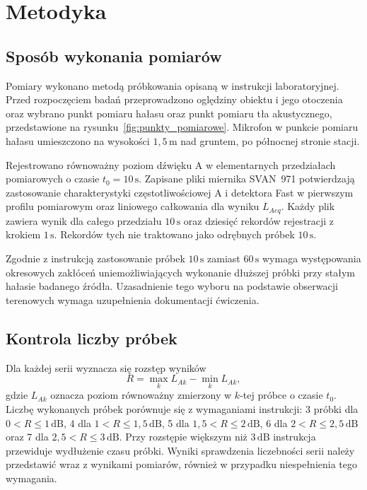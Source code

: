 \section{Metodyka}
\label{sec:metodyka}

\subsection{Sposób wykonania pomiarów}
Pomiary wykonano metodą próbkowania opisaną w instrukcji
laboratoryjnej. Przed rozpoczęciem badań przeprowadzono oględziny
obiektu i jego otoczenia oraz wybrano punkt pomiaru hałasu
oraz punkt pomiaru tła akustycznego, przedstawione na
rysunku~\ref{fig:punkty_pomiarowe}.
Mikrofon w punkcie pomiaru hałasu umieszczono na wysokości
$1{,}5\,\mathrm{m}$ nad gruntem, po północnej stronie stacji.

Rejestrowano równoważny poziom dźwięku A w elementarnych
przedziałach pomiarowych o czasie $t_0=10\,\mathrm{s}$.
Zapisane pliki miernika SVAN~971 potwierdzają zastosowanie
charakterystyki częstotliwościowej A i detektora Fast w pierwszym
profilu pomiarowym oraz liniowego całkowania dla wyniku $L_{Aeq}$.
Każdy plik zawiera wynik dla całego przedziału $10\,\mathrm{s}$
oraz dziesięć rekordów rejestracji z krokiem $1\,\mathrm{s}$.
Rekordów tych nie traktowano jako odrębnych próbek
$10\,\mathrm{s}$.

Zgodnie z instrukcją zastosowanie próbek $10\,\mathrm{s}$
zamiast $60\,\mathrm{s}$ wymaga występowania okresowych zakłóceń
uniemożliwiających wykonanie dłuższej próbki przy stałym hałasie
badanego źródła. Uzasadnienie tego wyboru na podstawie obserwacji
terenowych wymaga uzupełnienia dokumentacji ćwiczenia.

\subsection{Kontrola liczby próbek}
Dla każdej serii wyznacza się rozstęp wyników
\begin{equation}
 R=\max_k L_{Ak}-\min_k L_{Ak},
\end{equation}
gdzie $L_{Ak}$ oznacza poziom równoważny zmierzony w $k$-tej
próbce o czasie $t_0$.
Liczbę wykonanych próbek porównuje się z wymaganiami instrukcji:
3 próbki dla $0<R\leq1\,\mathrm{dB}$,
4 dla $1<R\leq1{,}5\,\mathrm{dB}$,
5 dla $1{,}5<R\leq2\,\mathrm{dB}$,
6 dla $2<R\leq2{,}5\,\mathrm{dB}$ oraz
7 dla $2{,}5<R\leq3\,\mathrm{dB}$.
Przy rozstępie większym niż $3\,\mathrm{dB}$ instrukcja
przewiduje wydłużenie czasu próbki.
Wyniki sprawdzenia liczebności serii należy przedstawić
wraz z wynikami pomiarów, również w przypadku niespełnienia
tego wymagania.

